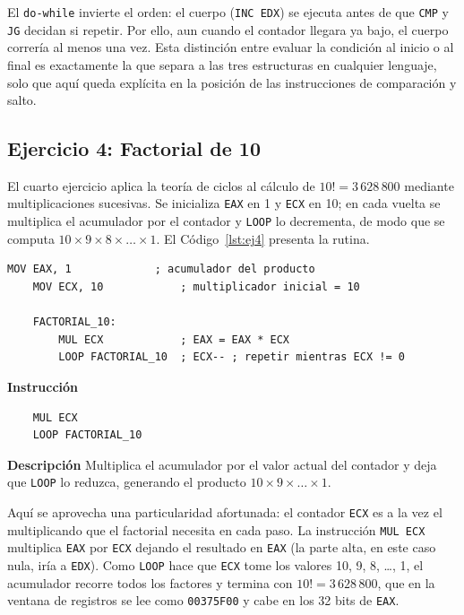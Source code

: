 \documentclass[a4paper,12pt]{article}
\newcommand{\hex}[1]{\texttt{\textcolor{hexcolor}{#1}}}
\begin{document}
El \texttt{do-while} invierte el orden: el cuerpo (\texttt{INC EDX}) se ejecuta antes de que \texttt{CMP} y \texttt{JG} decidan si repetir. Por ello, aun cuando el contador llegara ya bajo, el cuerpo correría al menos una vez. Esta distinción entre evaluar la condición al inicio o al final es exactamente la que separa a las tres estructuras en cualquier lenguaje, solo que aquí queda explícita en la posición de las instrucciones de comparación y salto.

\subsection{Ejercicio 4: Factorial de 10}
El cuarto ejercicio aplica la teoría de ciclos al cálculo de \(10! = 3\,628\,800\) mediante multiplicaciones sucesivas. Se inicializa \texttt{EAX} en 1 y \texttt{ECX} en 10; en cada vuelta se multiplica el acumulador por el contador y \texttt{LOOP} lo decrementa, de modo que se computa \(10 \times 9 \times 8 \times \dots \times 1\). El Código~\ref{lst:ej4} presenta la rutina.

\begin{lstlisting}[style=assemblyStyle, caption={Cálculo del factorial de 10 con multiplicaciones sucesivas.}, label={lst:ej4}]
    MOV EAX, 1             ; acumulador del producto
    MOV ECX, 10            ; multiplicador inicial = 10

    FACTORIAL_10:
        MUL ECX            ; EAX = EAX * ECX
        LOOP FACTORIAL_10  ; ECX-- ; repetir mientras ECX != 0
\end{lstlisting}

\begin{instruccionbox}
\textbf{Instrucción}
\begin{lstlisting}
    MUL ECX
    LOOP FACTORIAL_10
\end{lstlisting}
\textbf{Descripción}
Multiplica el acumulador por el valor actual del contador y deja que \texttt{LOOP} lo reduzca, generando el producto \(10 \times 9 \times \dots \times 1\).
\end{instruccionbox}

Aquí se aprovecha una particularidad afortunada: el contador \texttt{ECX} es a la vez el multiplicando que el factorial necesita en cada paso. La instrucción \texttt{MUL ECX} multiplica \texttt{EAX} por \texttt{ECX} dejando el resultado en \texttt{EAX} (la parte alta, en este caso nula, iría a \texttt{EDX}). Como \texttt{LOOP} hace que \texttt{ECX} tome los valores 10, 9, 8, \dots, 1, el acumulador recorre todos los factores y termina con \(10! = 3\,628\,800\), que en la ventana de registros se lee como \hex{00375F00} y cabe en los 32 bits de \texttt{EAX}.
\end{document}

